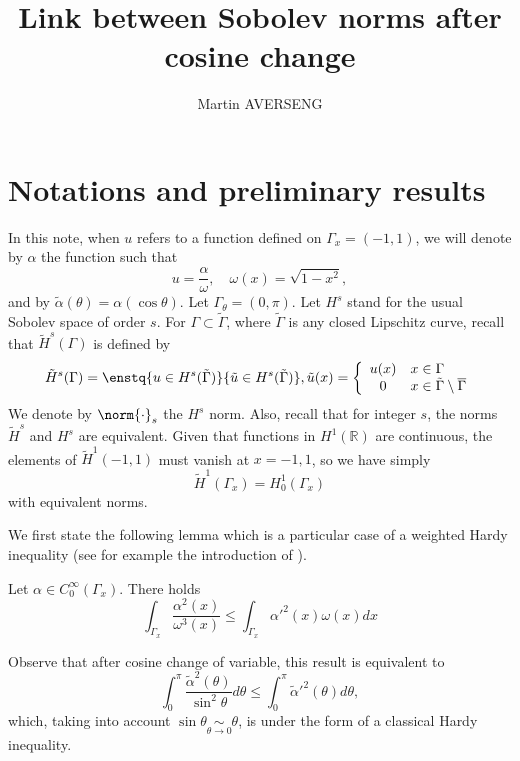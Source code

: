 \documentclass[11pt,a4paper]{article}
\author{Martin AVERSENG}
\title{Link between Sobolev norms after cosine change}
\begin{document}
	
	\maketitle
	\section{Notations and preliminary results}
	In this note, when $u$ refers to a function defined on $\Gamma_x = (-1,1)$, we will denote by $\alpha$ the function such that 
	\begin{equation}
	u = \dfrac{\alpha}{\omega}, \quad \omega(x) = \sqrt{1-x^2},
	\end{equation}
	and by $\tilde{\alpha}(\theta) = \alpha(\cos\theta)$. 
	Let $\Gamma_\theta = (0,\pi)$. Let $H^s$ stand for the usual Sobolev space of order $s$. For $\Gamma \subset \tilde{\Gamma}$, where $\tilde{\Gamma}$ is any closed Lipschitz curve, recall that $\tilde{H}^s(\Gamma)$ is defined by  
	\[\tilde{H}^s(\Gamma) = \enstq{u \in H^s(\tilde{\Gamma})}{\tilde{u} \in H^s(\tilde{\Gamma})}, \tilde{u}(x) = \left\{
		\begin{array}{cl}
			u(x) &  x \in \Gamma\\
			0 & x \in \tilde{\Gamma}\setminus\overline{\Gamma}
		\end{array} \right.\] 
	We denote by $\norm{\cdot}_s$ the $H^s$ norm. Also, recall that for integer $s$, the norms $\tilde{H}^s$ and $H^s$ are equivalent. Given that functions in $H^1(\mathbb{R})$ are continuous, the elements of $\tilde{H}^1(-1,1)$ must vanish at $x=-1,1$, so we have simply 
	\[ \tilde{H}^1(\Gamma_x) = H_0^1(\Gamma_x)\]
	with equivalent norms. 
	
	We first state the following lemma which is a particular case of a weighted Hardy inequality (see for example the introduction of \cite{edmunds2005weighted}). 
	\begin{Lem}
		\label{HardyWeighted}
		Let $\alpha \in C^{\infty}_0(\Gamma_x)$. There holds 
		\[ \int_{\Gamma_x} \frac{\alpha^2(x)}{\omega^3(x)} \leq \int_{\Gamma_x} \alpha'^2(x)\omega(x)dx\]		
	\end{Lem}
	\begin{Rem}
		Observe that after cosine change of variable, this result is equivalent to 
		\[ \int_{0}^{\pi} \frac{\tilde{\alpha}^2(\theta) }{\sin^2\theta}d\theta \leq \int_{0}^\pi \tilde{\alpha}'^2(\theta)d\theta,\]
		which, taking into account $\sin\theta \underset{\theta\to 0}{\sim}\theta$, is under the form of a classical Hardy inequality. 
	\end{Rem}
	
\end{document}
